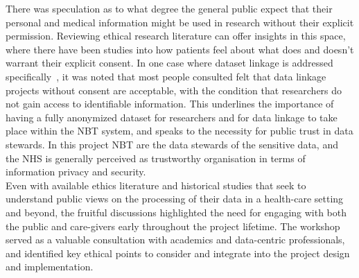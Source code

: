 \documentclass{article}
\begin{document}
There was speculation as to what degree the general public expect that
their personal and medical information might be used in research
without their explicit permission. Reviewing ethical research
literature can offer insights in this space, where there have been
studies into how patients feel about what does and doesn't warrant
their explicit consent. In one case where dataset linkage is addressed
specifically~\cite{xafis}, it was noted that most people consulted
felt that data linkage projects without consent are acceptable,
with the condition that researchers do not gain access to identifiable
information. This underlines the importance of having a fully
anonymized dataset for researchers and for data linkage to take place
within the NBT system, and speaks to the necessity for public trust in data
stewards. In this project NBT are the data stewards of the sensitive
data, and the NHS is generally perceived as trustworthy organisation in terms
of information privacy and security.  \\

Even with available ethics literature and historical studies that seek
to understand public views on the processing of their data in a
health-care setting and beyond, the fruitful discussions highlighted
the need for engaging with both the public and care-givers early
throughout the project lifetime. The workshop served as a valuable
consultation with academics and data-centric professionals, and
identified key ethical points to consider and integrate into the
project design and implementation. 


\printbibliography
\end{document}
